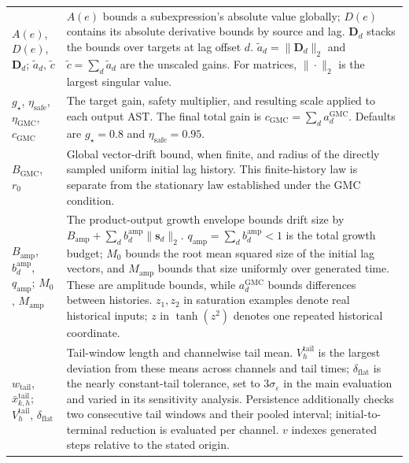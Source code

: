 \begin{longtable}{@{}
>{\raggedright\arraybackslash}p{}
>{\raggedright\arraybackslash}p{}@{}}
$A(e)$, $D(e)$, $\mathbf D_d$;
$\widetilde a_d$, $\widetilde c$ &
$A(e)$ bounds a subexpression's absolute value globally; $D(e)$ contains its
absolute derivative bounds by source and lag. $\mathbf D_d$ stacks the bounds
over targets at lag offset $d$. $\widetilde a_d=\|\mathbf D_d\|_2$ and
$\widetilde c=\sum_d\widetilde a_d$ are the unscaled gains. For matrices,
$\|\cdot\|_2$ is the largest singular value. \\

$g_\star$, $\eta_{\mathrm{safe}}$,
$\eta_{\mathrm{GMC}}$, $c_{\mathrm{GMC}}$ &
The target gain, safety multiplier, and resulting scale applied to each output
AST. The final total gain is $c_{\mathrm{GMC}}=\sum_d a_d^{\mathrm{GMC}}$.
Defaults are $g_\star=0.8$ and $\eta_{\mathrm{safe}}=0.95$. \\

$B_{\mathrm{GMC}}$, $r_0$ &
Global vector-drift bound, when finite, and radius of the directly sampled
uniform initial lag history. This finite-history law is separate from the
stationary law established under the GMC condition. \\

$B_{\mathrm{amp}}$, $b_d^{\mathrm{amp}}$, $q_{\mathrm{amp}}$;
$M_0$, $M_{\mathrm{amp}}$ &
The product-output growth envelope bounds drift size by
$B_{\mathrm{amp}}+\sum_d b_d^{\mathrm{amp}}\|\mathbf s_d\|_2$.
$q_{\mathrm{amp}}=\sum_d b_d^{\mathrm{amp}}<1$ is the total growth budget;
$M_0$ bounds the root mean squared size of the initial lag vectors, and
$M_{\mathrm{amp}}$ bounds that size uniformly over generated time.
These are amplitude bounds, while $a_d^{\mathrm{GMC}}$ bounds differences
between histories. $z_1,z_2$ in saturation examples denote real historical
inputs; $z$ in $\tanh(z^2)$ denotes one repeated historical coordinate. \\

$w_{\mathrm{tail}}$, $\bar x^{\mathrm{tail}}_{k,h}$;
$V_h^{\mathrm{tail}}$, $\delta_{\mathrm{flat}}$ &
Tail-window length and channelwise tail mean. $V_h^{\mathrm{tail}}$ is the
largest deviation from these means across channels and tail times;
$\delta_{\mathrm{flat}}$ is the nearly constant-tail tolerance, set to
$3\sigma_\varepsilon$ in the main evaluation and varied in its sensitivity
analysis. Persistence additionally checks two consecutive tail windows and
their pooled interval; initial-to-terminal reduction is evaluated per channel.
$v$ indexes generated steps relative to the stated origin. \\


\end{longtable}
